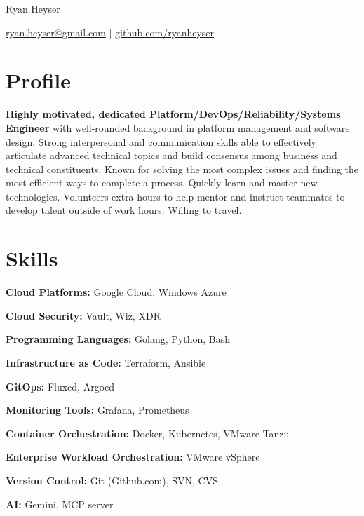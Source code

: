 \documentclass[11pt]{article}       %
\begin{document}
\centerline{\Huge Ryan Heyser}

\vspace{5pt}

\centerline{\href{mailto:ryan.heyser@gmail.com}{ryan.heyser@gmail.com} | \href{github.com/ryanheyser}{github.com/ryanheyser}}

\vspace{-10pt}

\section*{Profile}
\begin{description}
\item\textbf{Highly motivated, dedicated Platform/DevOps/Reliability/Systems Engineer} with well-rounded background in platform management and software design. Strong interpersonal and communication skills able to effectively articulate advanced technical topics and build consensus among business and technical constituents. Known for solving the most complex issues and finding the most efficient ways to complete a process. Quickly learn and master new technologies. Volunteers extra hours to help mentor and instruct teammates to develop talent outside of work hours. Willing to travel. \\
\end{description}

\vspace{-6.5pt}

\section*{Skills}
\begin{description}
\item\textbf{Cloud Platforms:} Google Cloud, Windows Azure
\vspace{-9.5pt}
\item\textbf{Cloud Security:} Vault, Wiz, XDR
\vspace{-9.5pt}
\item\textbf{Programming Languages:} Golang, Python, Bash
\vspace{-9.5pt}
\item\textbf{Infrastructure as Code:} Terraform, Ansible
\vspace{-9.5pt}
\item\textbf{GitOps:} Fluxcd, Argocd
\vspace{-9.5pt}
\item\textbf{Monitoring Tools:} Grafana, Prometheus
\vspace{-9.5pt}
\item\textbf{Container Orchestration:} Docker, Kubernetes, VMware Tanzu
\vspace{-9.5pt}
\item\textbf{Enterprise Workload Orchestration:} VMware vSphere
\vspace{-9.5pt}
\item\textbf{Version Control:} Git (Github.com), SVN, CVS
\vspace{-9.5pt}
\item\textbf{AI:} Gemini, MCP server
\end{description}
\end{document}
